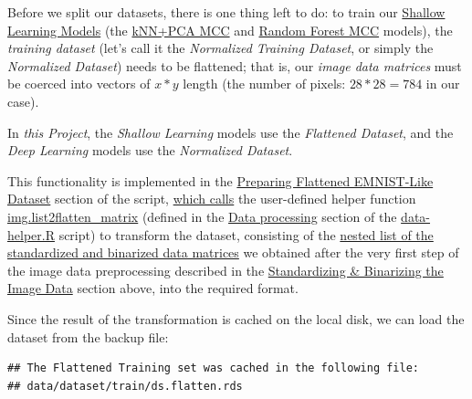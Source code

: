\documentclass[
]{report}
\begin{document}
Before we split our datasets, there is one thing left to do: to train our \hyperref[shallow-learning-models]{Shallow Learning Models} (the \hyperref[knn_pca_model]{kNN+PCA MCC} and \hyperref[rf_model]{Random Forest MCC} models), the \emph{training dataset} (let's call it the \emph{Normalized Training Dataset}, or simply the \emph{Normalized Dataset}) needs to be flattened; that is, our \emph{image data matrices} must be coerced into vectors of \(x*y\) length (the number of pixels: \(28*28 = 784\) in our case).

\begin{noteblock}
In \emph{this Project}, the \emph{Shallow Learning} models use the \emph{Flattened Dataset}, and the \emph{Deep Learning} models use the \emph{Normalized Dataset}.

\end{noteblock}

This functionality is implemented in the \href{https://github.com/AzKurban-edX-DS/edx.capstone.choose-your-own/blob/main/r/support-scripts/prepare-training-set.R\#L8-L52}{Preparing Flattened EMNIST-Like Dataset} section of the script, \href{https://github.com/AzKurban-edX-DS/edx.capstone.choose-your-own/blob/main/r/support-scripts/prepare-training-set.R\#L28}{which calls} the user-defined helper function \href{https://github.com/AzKurban-edX-DS/edx.capstone.choose-your-own/blob/main/r/support-functions/data-helper.R\#L557}{img.list2flatten\_matrix} (defined in the \href{https://github.com/AzKurban-edX-DS/edx.capstone.choose-your-own/blob/main/r/support-functions/data-helper.R\#L519-L1080}{Data processing} section of the \href{https://github.com/AzKurban-edX-DS/edx.capstone.choose-your-own/blob/main/r/support-functions/data-helper.R\#L557}{data-helper.R} script) to transform the dataset, consisting of the \hyperref[ds_overview.train.img.std_bin.ls.nested.structure]{nested list of the standardized and binarized data matrices} we obtained after the very first step of the image data preprocessing described in the \hyperref[standardizing-binarizing-the-image-data]{Standardizing \& Binarizing the Image Data} section above, into the required format.

Since the result of the transformation is cached on the local disk, we can load the dataset from the backup file:

\begin{verbatim}
## The Flattened Training set was cached in the following file:
## data/dataset/train/ds.flatten.rds
\end{verbatim}
\end{document}

